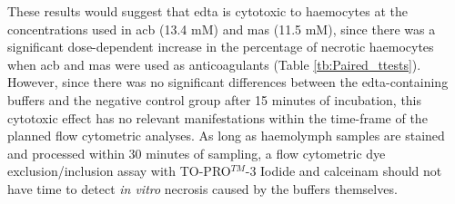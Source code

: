 \begin{table}[h]
\centering
	\caption{Paired two-tailed t-tests were used to assess wether the percentages of necrotic haemocytes increased with incubation time within each group. The difference between means at t = 15 min, 2 hours and 20 hours are presented with 95\% confidence intervals and the belonging p-value.}
	\label{tb:Paired_ttests}
\end{table}

These results would suggest that \acrshort{edta} is cytotoxic to haemocytes at the concentrations used in \acrshort{acb} (13.4 mM) and \acrshort{mas} (11.5 mM), since there was a significant dose-dependent increase in the percentage of necrotic haemocytes when \acrshort{acb} and \acrshort{mas} were used as anticoagulants (Table \ref{tb:Paired_ttests}). However, since there was no significant differences between the \acrshort{edta}-containing buffers and the negative control group after 15 minutes of incubation, this cytotoxic effect has no relevant manifestations within the time-frame of the planned flow cytometric analyses. As long as haemolymph samples are stained and processed within 30 minutes of sampling, a flow cytometric dye exclusion/inclusion assay with TO-PRO$^{TM}$-3 Iodide and \acrshort{calceinam} should not have time to detect \emph{in vitro} necrosis caused by the buffers themselves.

